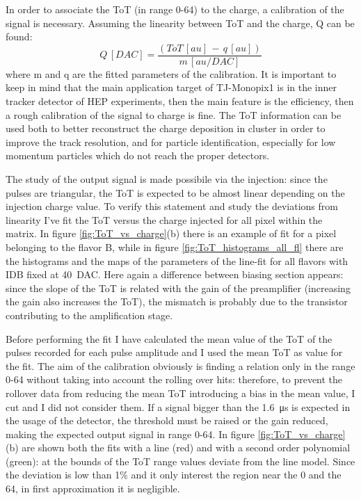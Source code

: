         In order to associate the ToT (in range 0-64) to the charge, a calibration of the signal is necessary. Assuming the linearity between ToT and the charge, Q can be found: 
        \begin{equation}
            Q\, [DAC] = \frac{(ToT\,[au]\, -\, q\,[au])}{m\, [au/DAC]} 
        \end{equation}
        where m and q are the fitted parameters of the calibration.
        It is important to keep in mind that the main application target of TJ-Monopix1 is in the inner tracker detector of HEP experiments, then the main feature is the efficiency, then a rough calibration of the signal to charge is fine. The ToT information can be used both to better reconstruct the charge deposition in cluster in order to improve the track resolution, and for particle identification, especially for low momentum particles which do not reach the proper detectors.
                        
        The study of the output signal is made possibile via the injection: since the pulses are triangular, the ToT is expected to be almost linear depending on the injection charge value.
        To verify this statement and study the deviations from linearity I've fit the ToT versus the charge injected for all pixel within the matrix.
        In figure \ref{fig:ToT_vs_charge}(b) there is an example of fit for a pixel belonging to the flavor B, while in figure \ref{fig:ToT_histograms_all_fl} there are the histograms and the maps of the parameters of the line-fit for all flavors with IDB fixed at \SI{40}{DAC}. Here again a difference between biasing section appears: since the slope of the ToT is related with the gain of the preamplifier (increasing the gain also increases the ToT), the mismatch is probably due to the transistor contributing to the amplification stage.

        Before performing the fit I have calculated the mean value of the ToT of the pulses recorded for each pulse amplitude and I used the mean ToT as value for the fit. 
        The aim of the calibration obviously is finding a relation only in the range 0-64 without taking into account the rolling over hits: therefore, to prevent the rollover data from reducing the mean ToT introducing a bias in the mean value, I cut and I did not consider them. 
        If a signal bigger than the \SI{1.6}{\us} is expected in the usage of the detector, the threshold must be raised or the gain reduced, making the expected output signal in range 0-64. 
        In figure \ref{fig:ToT_vs_charge} (b) are shown both the fits with a line (red) and with a second order polynomial (green): at the bounds of the ToT range values deviate from the line model. Since the deviation is low than 1\% and it only interest the region near the 0 and the 64, in first approximation it is negligible. 
        
